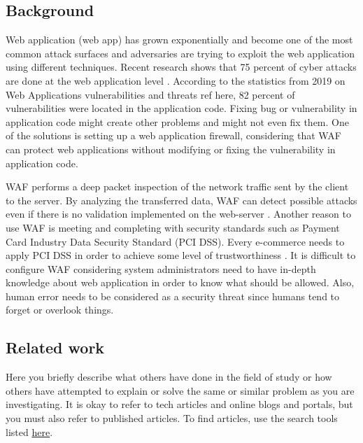 \documentclass[a4paper,12pt]{article}
\begin{document}
\subsection{Background}
Web application (web app) has grown exponentially and become one of the most common attack surfaces and adversaries are trying to exploit the web application using different techniques. Recent research shows that 75 percent of cyber attacks are done at the web application level \cite{acunetix}. According to the statistics from 2019 on Web Applications vulnerabilities and threats {\color{red}ref here}, 82 percent of vulnerabilities were located in the application code. Fixing bug or vulnerability in application code might create other problems and might not even fix them. One of the solutions is setting up a web application firewall, considering that WAF can protect web applications without modifying or fixing the vulnerability in application code.

WAF performs a deep packet inspection of the network traffic sent by the client to the server. By analyzing the transferred data, WAF can detect possible attacks even if there is no validation implemented on the web-server \cite{WAF}. Another reason to use WAF is meeting and completing with security standards such as Payment Card Industry Data Security Standard (PCI DSS). Every e-commerce needs to apply PCI DSS in order to achieve some level of trustworthiness \cite{WAF}. It is difficult to configure WAF considering system administrators need to have in-depth knowledge about web application in order to know what should be allowed\cite{config}. Also, human error needs to be considered as a security threat since humans tend to forget or overlook things.

\subsection{Related work}
{\color{red}Here you briefly describe what others have done in the field of study or how others have attempted to explain or solve the same or similar problem as you are investigating. It is okay to refer to tech articles and online blogs and portals, but you must also refer to published articles. To find articles, use the search tools listed \href{https://coursepress.lnu.se/subject/thesis-projects/tools/}{here}.}
\end{document}

